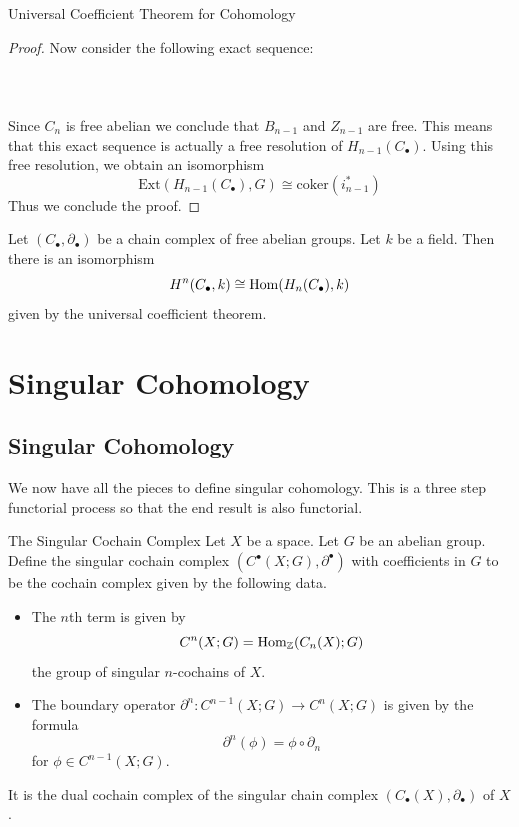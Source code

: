 \documentclass[a4paper]{article}
\begin{document}
\begin{thm}{Universal Coefficient Theorem for Cohomology}{}
\begin{proof}
Now consider the following exact sequence: \\~\\
\\~\\
Since $C_n$ is free abelian we conclude that $B_{n-1}$ and $Z_{n-1}$ are free. This means that this exact sequence is actually a free resolution of $H_{n-1}(C_\bullet)$. Using this free resolution, we obtain an isomorphism $$\text{Ext}(H_{n-1}(C_\bullet),G)\cong\text{coker}(i_{n-1}^\ast)$$ Thus we conclude the proof. 
\end{proof}
\end{thm}

\begin{crl}{}{} Let $(C_\bullet,\partial_\bullet)$ be a chain complex of free abelian groups. Let $k$ be a field. Then there is an isomorphism $$H^n(C_\bullet,k)\cong\operatorname{Hom}(H_n(C_\bullet),k)$$ given by the universal coefficient theorem. 
\end{crl}

\pagebreak
\section{Singular Cohomology}
\subsection{Singular Cohomology}
We now have all the pieces to define singular cohomology. This is a three step functorial process so that the end result is also functorial. 

\begin{defn}{The Singular Cochain Complex}{} Let $X$ be a space. Let $G$ be an abelian group. Define the singular cochain complex $(C^\bullet(X;G),\partial^\bullet)$ with coefficients in $G$ to be the cochain complex given by the following data. 
\begin{itemize}
\item The $n$th term is given by $$C^n(X;G)=\operatorname{Hom}_{\mathbb{Z}}(C_n(X);G)$$ the group of singular $n$-cochains of $X$. 
\item The boundary operator $\partial^n:C^{n-1}(X;G)\to C^n(X;G)$ is given by the formula $$\partial^n(\phi)=\phi\circ\partial_n$$ for $\phi\in C^{n-1}(X;G)$. 
\end{itemize}
It is the dual cochain complex of the singular chain complex $(C_\bullet(X),\partial_\bullet)$ of $X$. 
\end{defn}
\end{document}
